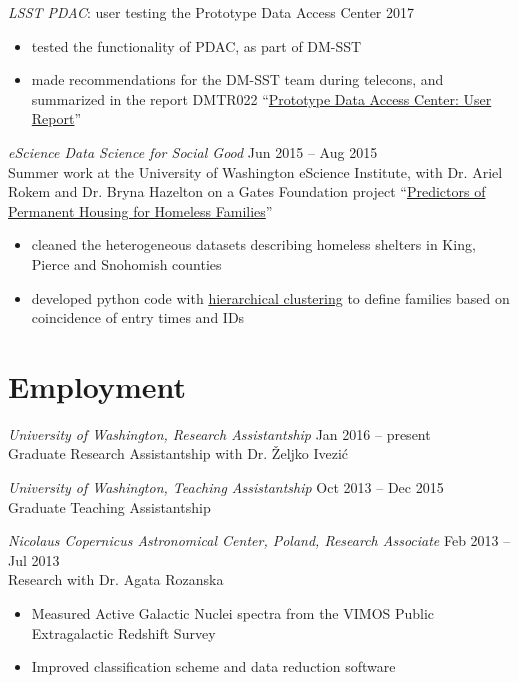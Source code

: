 \documentclass[margin]{res}
\begin{document}
\begin{resume}
{\sl LSST PDAC}: user testing the Prototype Data Access Center \hfill            2017
\begin{itemize}  \itemsep -2pt 
\item tested the functionality of PDAC, as part of DM-SST
\item made recommendations for the DM-SST team during telecons, and summarized in the report DMTR022 ``\href{https://ls.st/DMTR-22}{Prototype Data Access Center: User Report}'' 
\end{itemize}



{\sl eScience Data Science for Social Good} \hfill Jun 2015 -- Aug 2015\\
 Summer work at the University of Washington eScience Institute, with Dr. Ariel Rokem and Dr. Bryna Hazelton  on a Gates Foundation project ``\href{https://escience.washington.edu/get-involved/data-science-for-social-good/dssg-project-summaries-15}{Predictors of Permanent Housing for Homeless Families}''
\begin{itemize}  \itemsep -1pt 
\item cleaned the heterogeneous datasets describing homeless shelters in King, Pierce and Snohomish counties
\item developed python code with \href{https://uwescience.github.io/DSSG2015-predicting-permanent-housing/2015-07-27-chris-galaxy-clusters/}{hierarchical clustering}  to define families based on coincidence of entry times and IDs
\end{itemize}



\section{Employment} 

{\sl University of Washington, Research Assistantship} \hfill           Jan 2016 -- present\\ Graduate Research Assistantship with Dr. \v{Z}eljko Ivezi\'c 


{\sl University of Washington, Teaching Assistantship} \hfill           Oct 2013 -- Dec 2015 \\ Graduate Teaching Assistantship


{\sl Nicolaus Copernicus Astronomical Center, Poland, Research Associate} \hfill Feb 2013 -- Jul 2013 \\ Research with Dr. Agata Rozanska
\begin{itemize}
	\item Measured Active Galactic Nuclei spectra from the VIMOS Public Extragalactic Redshift Survey
	\item Improved classification scheme and data reduction software
\end{itemize}



\end{resume}
\end{document}
